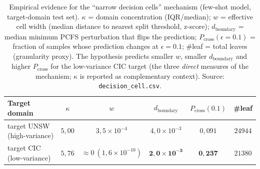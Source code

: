 \documentclass[11pt,a4paper]{article}
\begin{document}
\begin{table}[h]
\centering
\caption{Empirical evidence for the ``narrow decision cells'' mechanism (few-shot
model, target-domain test set). $\kappa$ = domain concentration (IQR/median);
$w$ = effective cell width (median distance to nearest split threshold, z-score);
$d_{\text{boundary}}$ = median minimum PCFS perturbation that flips the prediction;
$P_{\text{cross}}(\epsilon{=}0.1)$ = fraction of samples whose prediction changes at
$\epsilon{=}0.1$; \#leaf = total leaves (granularity proxy). The hypothesis predicts
smaller $w$, smaller $d_{\text{boundary}}$ and higher $P_{\text{cross}}$ for the low-variance CIC target (the three \emph{direct} measures of the mechanism; $\kappa$ is reported as complementary context). Source:
\texttt{decision\_cell.csv}.}
\label{tab:decisioncell}
\small
\begin{tabular}{lccccc}
\toprule
Target domain & $\kappa$ & $w$ & $d_{\text{boundary}}$ & $P_{\text{cross}}(0.1)$ & \#leaf \\
\midrule
target UNSW (high-variance) & $5{,}00$ & $3{,}5\times10^{-4}$ & $4{,}0\times10^{-3}$ & $0{,}091$ & $24944$ \\
target CIC (low-variance)   & $5{,}76$ & $\approx\!0\ (1{,}6\times10^{-10})$ & $\mathbf{2{,}0\times10^{-3}}$ & $\mathbf{0{,}237}$ & $21380$ \\
\bottomrule
\end{tabular}
\end{table}
\end{document}
